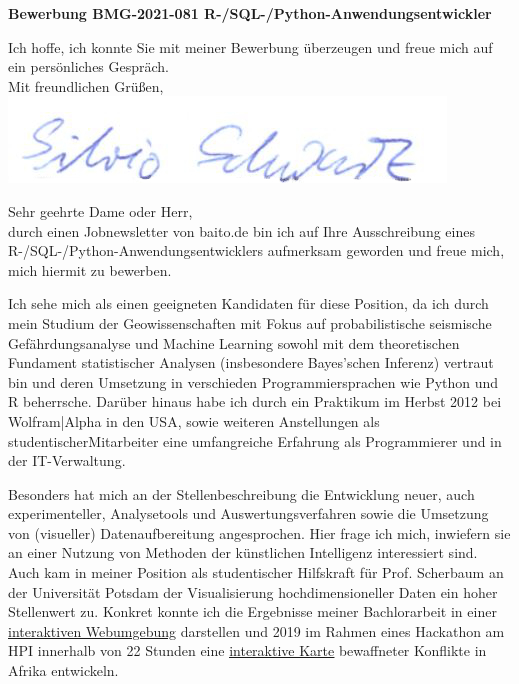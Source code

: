 \documentclass[11pt,a4paper,roman]{moderncv}
\begin{document}
\recipient{~}{ }
\date{\today}
\opening{\textbf{Bewerbung BMG-2021-081 R-/SQL-/Python-Anwendungsentwickler 
}}
\closing{Ich hoffe, ich konnte Sie mit meiner Bewerbung überzeugen und freue mich auf ein persönliches Gespräch.\\
\vspace{1cm}
Mit freundlichen Grüßen,\\ \vspace{0.2cm}
\includegraphics[scale=0.4]{../../img/Unterschrift_Silvio} \vspace{-1cm}
}
\makelettertitle

Sehr geehrte Dame oder Herr,\\
durch einen Jobnewsletter von baito.de bin ich auf Ihre Ausschreibung eines R-/SQL-/Python-Anwendungsentwicklers aufmerksam geworden und freue mich, mich hiermit zu bewerben.

Ich sehe mich als einen geeigneten Kandidaten für diese Position, da ich durch mein Studium der Geowissenschaften mit Fokus auf probabilistische seismische Gefährdungsanalyse und Machine Learning sowohl mit dem theoretischen Fundament statistischer Analysen (insbesondere Bayes'schen Inferenz) vertraut bin und deren Umsetzung in verschieden Programmiersprachen wie Python und R beherrsche. Darüber hinaus habe ich durch ein Praktikum im Herbst 2012 bei Wolfram|Alpha in den USA, sowie weiteren Anstellungen als studentischerMitarbeiter eine umfangreiche Erfahrung als Programmierer und in der IT-Verwaltung.

Besonders hat mich an der Stellenbeschreibung die Entwicklung neuer, auch experimenteller, Analysetools und Auswertungsverfahren sowie die 
Umsetzung von (visueller) Datenaufbereitung angesprochen. Hier frage ich mich, inwiefern sie an einer Nutzung von Methoden der künstlichen Intelligenz interessiert sind. Auch kam in meiner Position als studentischer Hilfskraft für Prof. Scherbaum an der Universität Potsdam der Visualisierung hochdimensioneller Daten ein hoher Stellenwert zu. Konkret konnte ich die Ergebnisse meiner Bachlorarbeit in einer \href{https://earthquake-distances.herokuapp.com/}{\color{pblue}\underline{interaktiven Webumgebung}} darstellen und 2019 im Rahmen eines Hackathon am HPI innerhalb von 22 Stunden eine \href{https://earthquake-distances.herokuapp.com}{\color{pblue}\underline{interaktive Karte}} bewaffneter Konflikte in Afrika entwickeln.
\end{document}
